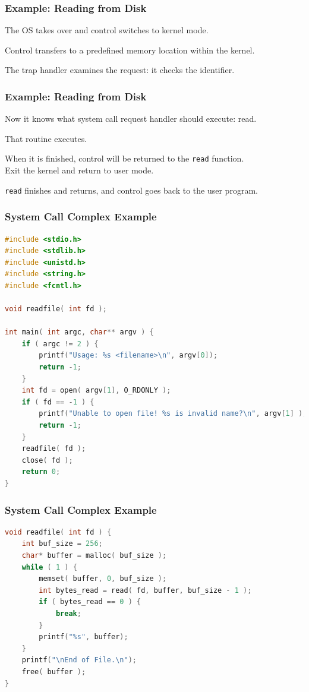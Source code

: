 \begin{frame}
	\frametitle{Example: Reading from Disk}


	The OS takes over and control switches to kernel mode.

	Control transfers to a predefined memory location within the kernel.

	The trap handler examines the request: it checks the identifier.
	

\end{frame}

\begin{frame}[fragile]
	\frametitle{Example: Reading from Disk}
	

	Now it knows what system call request handler should execute: read.

	That routine executes.

	When it is finished, control will be returned to the \texttt{read} function.\\
	\quad Exit the kernel and return to user mode.

	\texttt{read} finishes and returns, and control goes back to the user program.


\end{frame}


\begin{frame}[fragile]
	\frametitle{System Call Complex Example}

	\begin{lstlisting}[language=C]
#include <stdio.h>
#include <stdlib.h>
#include <unistd.h>
#include <string.h>
#include <fcntl.h>

void readfile( int fd );

int main( int argc, char** argv ) {
    if ( argc != 2 ) {
        printf("Usage: %s <filename>\n", argv[0]);
        return -1;
    }
    int fd = open( argv[1], O_RDONLY );
    if ( fd == -1 ) {
        printf("Unable to open file! %s is invalid name?\n", argv[1] );
        return -1;
    }
    readfile( fd );
    close( fd );
    return 0;
}
\end{lstlisting}
\end{frame}

\begin{frame}[fragile]
	\frametitle{System Call Complex Example}

	\begin{lstlisting}[language=C]
void readfile( int fd ) {
    int buf_size = 256;
    char* buffer = malloc( buf_size );
    while ( 1 ) {
        memset( buffer, 0, buf_size );
        int bytes_read = read( fd, buffer, buf_size - 1 );  
        if ( bytes_read == 0 ) {
            break; 
        }     
        printf("%s", buffer);
    }
    printf("\nEnd of File.\n");
    free( buffer );
}
\end{lstlisting}


\end{frame}


